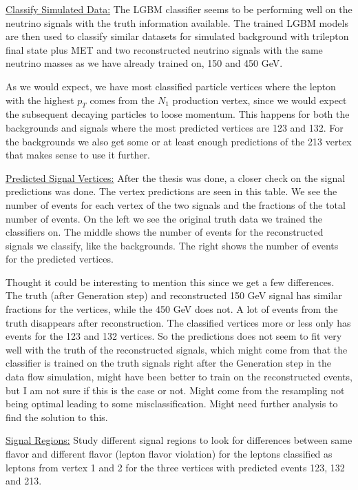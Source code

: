 \documentclass[a4paper, american, 12pt]{report}
\begin{document}
	
	\underline{Classify Simulated Data:}
	The LGBM classifier seems to be performing well on the neutrino signals with the truth information available. The trained LGBM models are then used to classify similar datasets for simulated background with trilepton final state plus MET and two reconstructed neutrino signals with the same neutrino masses as we have already trained on, 150 and 450 GeV.
	
	As we would expect, we have most classified particle vertices where the lepton with the highest $p_T$ comes from the $N_1$ production vertex, since we would expect the subsequent decaying particles to loose momentum. This happens for both the backgrounds and signals where the most predicted vertices are 123 and 132. For the backgrounds we also get some or at least enough predictions of the 213 vertex that makes sense to use it further.
	
	
	\underline{Predicted Signal Vertices:}
	After the thesis was done, a closer check on the signal predictions was done. The vertex predictions are seen in this table. We see the number of events for each vertex of the two signals and the fractions of the total number of events. On the left we see the original truth data we trained the classifiers on. The middle shows the number of events for the reconstructed signals we classify, like the backgrounds. The right shows the number of events for the predicted vertices.
	
	Thought it could be interesting to mention this since we get a few differences. The truth (after Generation step) and reconstructed 150 GeV signal has similar fractions for the vertices, while the 450 GeV does not. A lot of events from the truth disappears after reconstruction. The classified vertices more or less only has events for the 123 and 132 vertices. So the predictions does not seem to fit very well with the truth of the reconstructed signals, which might come from that the classifier is trained on the truth signals right after the Generation step in the data flow simulation, might have been better to train on the reconstructed events, but I am not sure if this is the case or not. Might come from the resampling not being optimal leading to some misclassification. Might need further analysis to find the solution to this.
	
	
	\underline{Signal Regions:}
	Study different signal regions to look for differences between same flavor and different flavor (lepton flavor violation) for the leptons classified as leptons from vertex 1 and 2 for the three vertices with predicted events 123, 132 and 213. 
	
\end{document}
